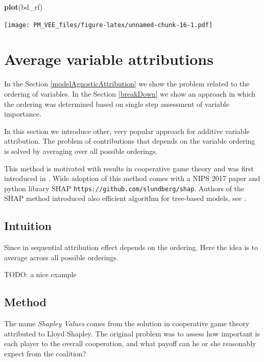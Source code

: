 \documentclass[]{krantz}
\newenvironment{Shaded}{\begin{snugshade}}{\end{snugshade}}
\newcommand{\KeywordTok}[1]{\textcolor[rgb]{0.13,0.29,0.53}{\textbf{#1}}}
\newcommand{\NormalTok}[1]{#1}
\theoremstyle{definition}
\theoremstyle{definition}
\theoremstyle{definition}
\theoremstyle{remark}
\begin{document}
\begin{Shaded}
\begin{Highlighting}[]
\KeywordTok{plot}\NormalTok{(bd_rf) }
\end{Highlighting}
\end{Shaded}

\texttt{[image: PM\_VEE\_files/figure-latex/unnamed-chunk-16-1.pdf]}

\hypertarget{shapley}{%
\section{Average variable attributions}\label{shapley}}

In the Section \ref{modelAgnosticAttribution} we show the problem
related to the ordering of variables. In the Section \ref{breakDown} we
show an approach in which the ordering was determined based on single
step assessment of variable importance.

In this section we introduce other, very popular approach for additive
variable attribution. The problem of contributions that depends on the
variable ordering is solved by averaging over all possible orderings.

This method is motivated with results in cooperative game theory and was
first introduced in \citep{Strumbelj2014}. Wide adoption of this method
comes with a NIPS 2017 paper \citep{SHAP} and python library SHAP
\texttt{https://github.com/slundberg/shap}. Authors of the SHAP method
introduced also efficient algorithm for tree-based models, see
\citep{TreeSHAP}.

\hypertarget{intuition-3}{%
\subsection{Intuition}\label{intuition-3}}

Since in sequential attribution effect depends on the ordering. Here the
idea is to average across all possible orderings.

TODO: a nice example

\hypertarget{method-3}{%
\subsection{Method}\label{method-3}}

The name \emph{Shapley Values} comes from the solution in cooperative
game theory attributed to Lloyd Shapley. The original problem was to
assess how important is each player to the overall cooperation, and what
payoff can he or she reasonably expect from the coalition?
\citep{shapleybook1952}
\end{document}
